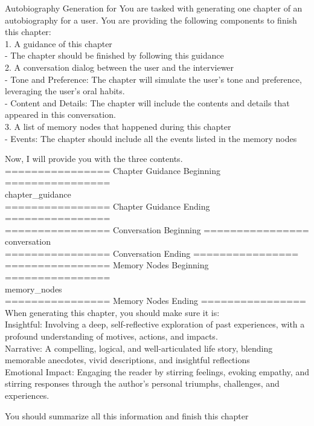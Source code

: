 \begin{myboxcross}{Autobiography Generation for \methodname}
You are tasked with generating one chapter of an autobiography for a user. You are providing the following components to finish this chapter:\\
1. A guidance of this chapter\\
- The chapter should be finished by following this guidance\\
2. A conversation dialog between the user and the interviewer \\
- Tone and Preference: The chapter will simulate the user's tone and preference, leveraging the user's oral habits.\\
- Content and Details: The chapter will include the contents and details that appeared in this conversation.\\
3. A list of memory nodes that happened during this chapter\\
- Events: The chapter should include all the events listed in the memory nodes

Now, I will provide you with the three contents.\\
================ Chapter Guidance Beginning ================\\
{chapter\_guidance}\\
================ Chapter Guidance Ending ================\\
================ Conversation Beginning ================\\
{conversation}\\
================ Conversation Ending ================\\
================ Memory Nodes Beginning ================\\
{memory\_nodes}\\
================ Memory Nodes Ending ================\\

When generating this chapter, you should make sure it is:\\
Insightful: Involving a deep, self-reflective exploration of past experiences, with a profound understanding of motives, actions, and impacts. \\
Narrative: A compelling, logical, and well-articulated life story, blending memorable anecdotes, vivid descriptions, and insightful reflections\\
Emotional Impact: Engaging the reader by stirring feelings, evoking empathy, and stirring responses through the author's personal triumphs, challenges, and experiences.

You should summarize all this information and finish this chapter

\end{myboxcross}

